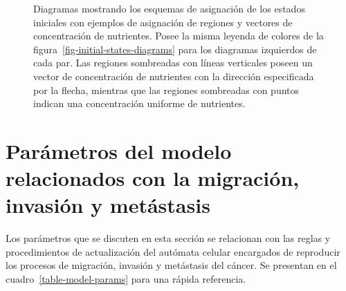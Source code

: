 \begin{figure}[!ht]
\begin{center}
\end{center}\vspace*{-0.75cm}
\caption[Diagramas mostrando los esquemas de asignaci\'on de los estados iniciales con ejemplos de asignaci\'on de regiones y vectores de concentraci\'on de nutrientes]{Diagramas mostrando los esquemas de asignaci\'on de los estados iniciales con ejemplos de asignaci\'on de regiones y vectores de concentraci\'on de nutrientes. Posee la misma leyenda de colores de la figura~\ref{fig-initial-states-diagrams} para los diagramas izquierdos de cada par. Las regiones sombreadas con l\'ineas verticales poseen un vector de concentraci\'on de nutrientes con la direcci\'on especificada por la flecha, mientras que las regiones sombreadas con puntos indican una concentraci\'on uniforme de nutrientes. }
\label{fig-initial-states-nutrients}
\end{figure}

\section{Par\'ametros del modelo relacionados con la migraci\'on, invasi\'on y met\'astasis}
\label{subsec-model-param}
Los par\'ametros que se discuten en esta secci\'on se relacionan con las reglas y procedimientos de actualizaci\'on del aut\'omata celular encargados de reproducir los procesos de migraci\'on, invasi\'on y met\'astasis del c\'ancer. Se presentan en el cuadro~\ref{table-model-params} para una r\'apida referencia.

